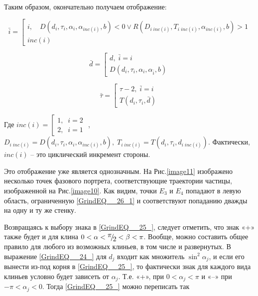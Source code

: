 \documentclass[a4paper]{article}
\begin{document}
Таким образом, окончательно получаем отображение:

\begin{equation} \label{GrindEQ__26_}\bar{i}=\left[\begin{array}{c} {i,\quad D\left(d_{i} ,\tau _{i} ,\alpha _{i} ,\alpha _{inc\left(i\right)} ,b\right)<0\vee R\left(D_{i\; inc(i)} ,T_{i\; inc(i)} ,\alpha _{inc(i)} ,b\right)>1} \\ {inc\left(i\right)} \end{array}\right. \end{equation}

\begin{equation} \label{GrindEQ__27_}\bar{d}=\left[\begin{array}{c} {d,\; \bar{i}=i} \\ {D\left(d_{i} ,\tau _{i} ,\alpha _{i} ,\alpha _{\bar{i}} ,b\right)} \end{array}\right. \end{equation}

\begin{equation} \label{GrindEQ__28_}\bar{\tau }=\left[\begin{array}{c} {\tau -2,\; \bar{i}=i} \\ {T\left(d_{i} ,\tau _{i} ,\bar{d}\right)} \end{array}\right. \end{equation}

Где $inc\left(i\right)=\left[\begin{array}{c} {1,\; \; i=2} \\ {2,\; \; i=1} \end{array}\right. $ , $D_{i\; inc(i)} =D\left(d_{i} ,\tau _{i} ,\alpha _{i} ,\alpha _{inc\left(i\right)} ,b\right),\; T_{i\; inc(i)} =T\left(d_{i} ,\tau _{i} ,d_{i\; inc\left(i\right)} \right)$. Фактически, $inc\left(i\right)$ -- это циклический инкремент стороны.

Это отображение уже является однозначным. На Рис.\ref{image11} изображено несколько точек фазового портрета, соответствующие траектории частицы, изображенной на Рис.\ref{image10}. Как видим, точки $E_{3}$ и $E_{4}$ попадают в левую область, ограниченную \eqref{GrindEQ__26_1} и соответствуют попаданию дважды на одну и ту же стенку.

Возвращаясь к выбору знака в \eqref{GrindEQ__25_}, следует отметить, что знак «+» также будет и для клина $0<\alpha <{\raise0.7ex\hbox{$ \pi  $}\!\mathord{\left/ {\vphantom {\pi  2}} \right. \kern-\nulldelimiterspace}\!\lower0.7ex\hbox{$ 2 $}} <\beta <\pi $. Вообще, можно составить общее правило для любого из возможных клиньев, в том числе и развернутых. В выражение \eqref{GrindEQ__24_} для $d_{j} $ входит как множитель $\sin ^{2} \alpha _{j} $, и если его вынести из-под корня в \eqref{GrindEQ__25_}, то фактически знак для каждого вида клиньев условно будет зависеть от $\alpha _{j} $. Т.е. «+», при $0<\alpha _{j} <\pi $ и «--» при $-\pi <\alpha _{j} <0$. Тогда \eqref{GrindEQ__25_} можно переписать так
\end{document}
